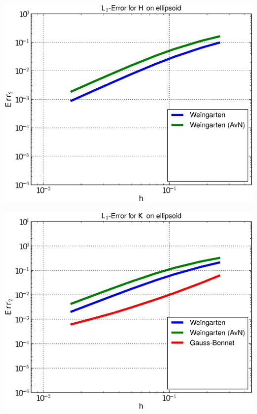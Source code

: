 \documentclass[handout]{beamer}
\begin{document}
\begin{frame}
\begin{overprint}
\begin{minipage}[t]{0.49\textwidth}
            \centering\includegraphics[width=\textwidth]{bilder/Curvature/heineC/ErrHL2_2.eps}
          \end{minipage}
          \begin{minipage}[t]{0.49\textwidth}
            \centering\includegraphics[width=\textwidth]{bilder/Curvature/heineC/ErrKL2_3.eps}
          \end{minipage}\hfill
          \begin{minipage}[t]{0.49\textwidth}

\end{minipage}
\end{overprint}
\end{frame}
\end{document}
